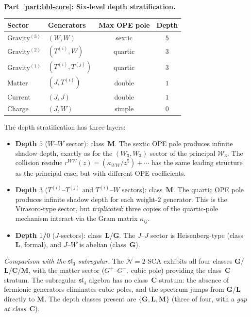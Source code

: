 \begin{computation}
\medskip
\noindent\textbf{Part~\ref{part:bbl-core}: Six-level depth stratification.}

\begin{center}
\renewcommand{\arraystretch}{1.15}
\begin{tabular}{llcc}
\textbf{Sector} & \textbf{Generators}
 & \textbf{Max OPE pole} & \textbf{Depth} \\
\hline
Gravity$^{(3)}$ & $(W,W)$ & sextic & $5$ \\
Gravity$^{(2)}$ & $(T^{(i)},W)$ & quartic & $3$ \\
Gravity$^{(1)}$ & $(T^{(i)},T^{(j)})$ & quartic & $3$ \\
Matter & $(J,T^{(i)})$ & double & $1$ \\
Current & $(J,J)$ & double & $1$ \\
Charge & $(J,W)$ & simple & $0$
\end{tabular}
\end{center}

The depth stratification has three layers:
\begin{itemize}
\item \textbf{Depth $5$} ($W$--$W$ sector): class~$\mathbf{M}$.
 The sextic OPE pole produces infinite shadow depth,
 exactly as for the $(W_3,W_3)$ sector of the principal
 $\mathcal W_3$. The collision residue
 $r^{WW}(z) = (\kappa_{WW}/z^5) + \cdots$ has
 the same leading structure as the principal case, but
 with different OPE coefficients.
\item \textbf{Depth $3$} ($T^{(i)}$--$T^{(j)}$ and
 $T^{(i)}$--$W$ sectors): class~$\mathbf{M}$.
 The quartic OPE pole produces infinite shadow depth for
 each weight-$2$ generator. This is the Virasoro-type
 sector, but \emph{triplicated}: three copies of the
 quartic-pole mechanism interact via the Gram matrix
 $\kappa_{ij}$.
\item \textbf{Depth $1$/$0$} ($J$-sectors):
 class~$\mathbf{L}$/$\mathbf{G}$.
 The $J$--$J$ sector is Heisenberg-type (class~$\mathbf{L}$,
 formal), and $J$--$W$ is abelian (class~$\mathbf{G}$).
\end{itemize}

\emph{Comparison with the $\mathfrak{sl}_3$ subregular.}
The $\mathcal N=2$ SCA exhibits all four classes
$\mathbf{G}$/$\mathbf{L}$/$\mathbf{C}$/$\mathbf{M}$, with
the matter sector ($G^+$--$G^-$, cubic pole) providing the
class~$\mathbf{C}$ stratum. The subregular
$\mathfrak{sl}_4$ algebra has no class~$\mathbf{C}$
stratum: the absence of fermionic generators eliminates
cubic poles, and the spectrum jumps from
$\mathbf{G}$/$\mathbf{L}$ directly to $\mathbf{M}$. The
depth classes present are $\{\mathbf{G}, \mathbf{L}, \mathbf{M}\}$
(three of four, with a \emph{gap at class~$\mathbf{C}$}).


\end{computation}
